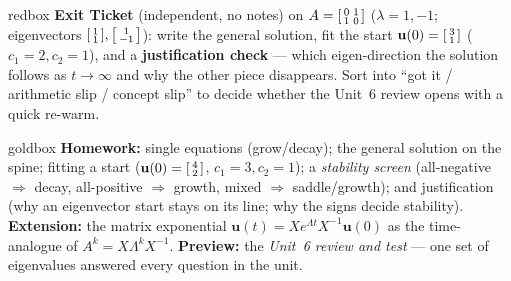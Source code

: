 \documentclass[10pt]{article}
\newcommand{\uu}{\mathbf{u}}
\begin{document}
\begin{skillbox}{redbox}
\textbf{Exit Ticket} (independent, no notes) on $A=\begin{bsmallmatrix}0&1\\1&0\end{bsmallmatrix}$
($\lambda=1,-1$; eigenvectors $\begin{bsmallmatrix}1\\1\end{bsmallmatrix},\begin{bsmallmatrix}1\\-1\end{bsmallmatrix}$):
write the general solution, fit the start $\uu(0)=\begin{bsmallmatrix}3\\1\end{bsmallmatrix}$ ($c_1=2,c_2=1$),
and a \textbf{justification check} --- which eigen-direction the solution follows as $t\to\infty$ and why the
other piece disappears. Sort into ``got it / arithmetic slip / concept slip'' to decide whether the Unit~6
review opens with a quick re-warm.
\end{skillbox}

\begin{skillbox}{goldbox}
\textbf{Homework:} single equations (grow/decay); the general solution on the spine; fitting a start
($\uu(0)=\begin{bsmallmatrix}4\\2\end{bsmallmatrix}$, $c_1=3,c_2=1$); a \emph{stability screen} (all-negative
$\Rightarrow$ decay, all-positive $\Rightarrow$ growth, mixed $\Rightarrow$ saddle/growth); and justification
(why an eigenvector start stays on its line; why the signs decide stability). \textbf{Extension:} the matrix
exponential $\uu(t)=Xe^{\Lambda t}X^{-1}\uu(0)$ as the time-analogue of $A^k=X\Lambda^k X^{-1}$.
\textbf{Preview:} the \emph{Unit~6 review and test} --- one set of eigenvalues answered every question in the
unit.
\end{skillbox}
\end{document}
